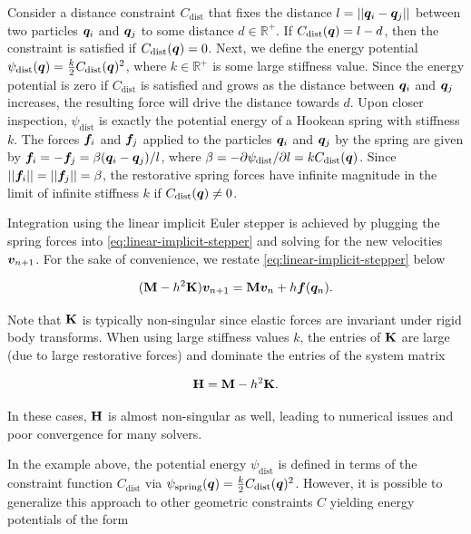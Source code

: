 Consider a distance constraint $C_{\text{dist}}$ that 
fixes the distance $l = \vert \vert \bm{q}_i - \bm{q}_j \vert \vert$ between two particles $\bm{q}_i$ and $\bm{q}_j$ to 
some distance $d \in \mathbb{R}^+$. If $C_{\text{dist}}(\bm{q}) = l - d$, then the constraint is satisfied if 
$C_{\text{dist}}(\bm{q}) = 0$. Next, we define the energy potential $\psi_\text{dist}(\bm{q}) = \frac{k}{2}C_\text{dist}(\bm{q})^2$,
where $k \in \mathbb{R}^+$ is some large stiffness value. Since the energy potential is zero if $C_\text{dist}$ is satisfied
and grows as the distance between $\bm{q}_i$ and $\bm{q}_j$ increases, the resulting force will drive the distance towards $d$.
Upon closer inspection, $\psi_\text{dist}$ is exactly the potential energy of a Hookean spring with stiffness $k$. The forces 
$\bm{f}_i$ and $\bm{f}_j$ applied to the particles $\bm{q}_i$ and $\bm{q}_j$ by the spring are given by 
$\bm{f}_i = -\bm{f}_j = \beta (\bm{q}_i - \bm{q}_j) / l$, where $\beta = -\partial\psi_\text{dist}/\partial l = 
kC_\text{dist}(\bm{q})$. Since $\vert \vert \bm{f}_i \vert \vert = \vert \vert \bm{f}_j \vert \vert = \beta$,
the restorative spring forces have infinite magnitude in the limit of infinite stiffness $k$ if $C_\text{dist}(\bm{q}) \neq 0$. 

Integration using the linear implicit Euler stepper is achieved by plugging the spring forces into 
\autoref{eq:linear-implicit-stepper} and solving for the new velocities $\bm{v}_{n+1}$. For the sake of convenience, we restate
\autoref{eq:linear-implicit-stepper} below

\[
    (\mathbf{M} - h^2\mathbf{K})\bm{v}_{n+1} = \mathbf{M}\bm{v}_n + h\bm{f}(\bm{q}_n).
\]

\noindent Note that $\mathbf{K}$ is typically non-singular since elastic forces are invariant under rigid body transforms. When using 
large stiffness values $k$, the entries of $\mathbf{K}$ are large (due to large restorative forces) and dominate the entries of the 
system matrix 

\begin{equation}\label{eq:system-H}
    \mathbf{H} = \mathbf{M} - h^2\mathbf{K}.
\end{equation}

\noindent In these cases, $\mathbf{H}$ is almost non-singular as well, leading to numerical issues and poor convergence for many solvers. 

In the example above, the potential energy $\psi_\text{dist}$ is defined in terms of the constraint function $C_\text{dist}$ via 
$\psi_\text{spring}(\bm{q}) = \frac{k}{2} C_\text{dist}(\bm{q})^2$. However, it is possible to generalize this approach to other 
geometric constraints $C$ yielding energy potentials of the form

